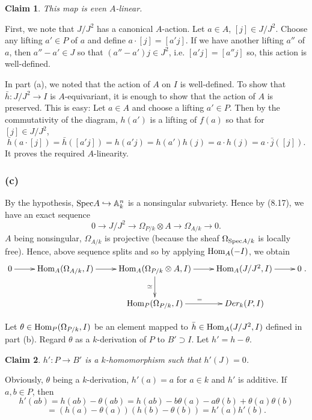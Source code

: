 \documentclass[11pt]{amsart}          %
\newcommand{\bbA}{\mathbb{A}}
\newcommand{\spec}{{\rm Spec}}
\newtheorem*{claim}{Claim}
\renewcommand{\hom}{{\rm Hom}}
\begin{document}
\begin{claim} This map is even $A$-linear.
\end{claim}

First, we note that $J/J^2$ has a canonical $A$-action. Let $a \in A$, $[j] \in J/J^2$. Choose any lifting $a' \in P$ of $a$ and define $a \cdot [j] = [a' j]$. If we have another lifting $a'' $ of $a$, then $a'' - a' \in J$ so that $(a'' - a') j \in J^2$, i.e. $[a'j] = [a''j]$ so, this action is well-defined.

In part (a), we noted that the action of $A$ on $I$ is well-defined. To show that $\bar{h}: J/J^2 \to I$ is $A$-equivariant, it is enough to show that the action of $A$ is preserved. This is easy: Let $a \in A$ and choose a lifting $a' \in P$. Then by the commutativity of the diagram, $h(a')$ is a lifting of $f(a)$ so that for $[j] \in J/J^2$, $$\bar{h}(a \cdot [j]) = \bar{h} ([a'j]) = h(a'j) = h(a')h(j) = a \cdot h(j) = a \cdot \bar{j}([j]).$$ It proves the required $A$-linearity.

\subsubsection*{(c)} By the hypothesis, $\spec A \hookrightarrow \bbA_k ^n$ is a nonsingular subvariety. Hence by (8.17), we have an exact sequence
$$0 \to J/J^2 \to \Omega_{P/k} \otimes A \to \Omega_{A/k} \to 0.$$ $A$ being nonsingular, $\Omega_{A/k}$ is projective (because the sheaf $\Omega_{\spec A/k}$ is locally free). Hence, above sequence splits and so by applying $\hom_A(- I)$, we obtain
$$\xymatrix{0 \ar[r] & \hom_A(\Omega_{A/k}, I) \ar[r] & \hom_{A} (\Omega_{P/k} \otimes A, I) \ar[d]_{\simeq} \ar[r] & \hom_A (J/J^2, I) \ar[r] &0 \\
& & \hom_{P}(\Omega_{P/k}, I) \ar[r]^= & Der_k(P,I) &}.$$

Let $\theta \in \hom_P(\Omega_{P/k}, I)$ be an element mapped to $\bar{h} \in \hom_A(J/J^2, I)$ defined in part (b). Regard $\theta$ as a $k$-derivation of $P$ to $B' \supset I$. Let $h' = h - \theta$.
\begin{claim} $h' : P \to B'$ is a $k$-homomorphism such that $h'(J) = 0$.
\end{claim}

Obviously, $\theta$ being a $k$-derivation, $h'(a) = a$ for $a \in k$ and $h'$ is additive. If $a, b \in P$, then $$h'(ab) = h(ab) - \theta(ab) = h(ab) - b\theta(a) - a \theta(b) + \theta(a) \theta(b) $$
$$ = (h(a) - \theta(a))(h(b) - \theta(b)) = h'(a) h'(b).$$
\end{document}
